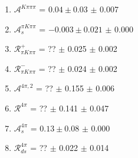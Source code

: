 \begin{enumerate}
\item $\mathcal{A}^{K\pi\pi\pi}$ = $0.04 \pm 0.03$ $\pm$ 0.007
\item $\mathcal{A}_s^{\pi K\pi\pi}$ = $-0.003 \pm 0.021$ $\pm$ 0.000
\item $\mathcal{R}_{\pi K\pi\pi}^+$ = ?? $\pm$ 0.025 $\pm$ 0.002
\item $\mathcal{R}_{\pi K\pi\pi}^-$ = ?? $\pm$ 0.024 $\pm$ 0.002
\item $\mathcal{A}^{4\pi,2}$ = ?? $\pm$ 0.155 $\pm$ 0.006
\item $\mathcal{R}^{4\pi}$ = ?? $\pm$ 0.141 $\pm$ 0.047
\item $\mathcal{A}_s^{4\pi}$ = $0.13 \pm 0.08$ $\pm$ 0.000
\item $\mathcal{R}_{ds}^{4\pi}$ = ?? $\pm$ 0.022 $\pm$ 0.014
\end{enumerate}
